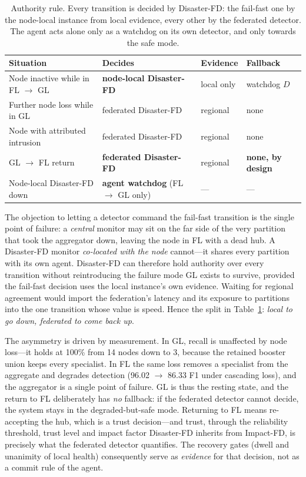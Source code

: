 \begin{table}[htbp]
\centering
\caption{Authority rule. Every transition is decided by Disaster-FD: the fail-fast one by
the node-local instance from local evidence, every other by the federated detector. The
agent acts alone only as a watchdog on its own detector, and only towards the safe mode.}
\label{tab:authority}
\begin{tabular}{@{}llll@{}}
\toprule
Situation & Decides & Evidence & Fallback \\
\midrule
Node inactive while in FL $\rightarrow$ GL & \textbf{node-local Disaster-FD} & local only & watchdog $D$ \\
Further node loss while in GL & federated Disaster-FD & regional & none \\
Node with attributed intrusion & federated Disaster-FD & regional & none \\
GL $\rightarrow$ FL return & \textbf{federated Disaster-FD} & regional & \textbf{none, by design} \\
Node-local Disaster-FD down & \textbf{agent watchdog} (FL $\rightarrow$ GL only) & --- & --- \\
\bottomrule
\end{tabular}
\end{table}

The objection to letting a detector command the fail-fast transition is the single point of
failure: a \emph{central} monitor may sit on the far side of the very partition that took
the aggregator down, leaving the node in FL with a dead hub. A Disaster-FD monitor
\emph{co-located with the node} cannot---it shares every partition with its own agent.
Disaster-FD can therefore hold authority over every transition without reintroducing the
failure mode GL exists to survive, provided the fail-fast decision uses the local
instance's own evidence. Waiting for regional agreement would import the federation's
latency and its exposure to partitions into the one transition whose value is speed. Hence
the split in Table~\ref{tab:authority}: \emph{local to go down, federated to come back up}.

The asymmetry is driven by measurement. In GL, recall is unaffected by node loss---it holds
at 100\% from 14 nodes down to 3, because the retained booster union keeps every
specialist. In FL the same loss removes a specialist from the aggregate and degrades
detection (96.02 $\rightarrow$ 86.33 F1 under cascading loss), and the aggregator is a
single point of failure. GL is thus the resting state, and the return to FL deliberately has
\emph{no} fallback: if the federated detector cannot decide, the system stays in the
degraded-but-safe mode. Returning to FL means re-accepting the hub, which is a trust
decision---and trust, through the reliability threshold, trust level and impact factor
Disaster-FD inherits from Impact-FD, is precisely what the federated detector quantifies.
The recovery gates (dwell and unanimity of local health) consequently serve as
\emph{evidence} for that decision, not as a commit rule of the agent.

